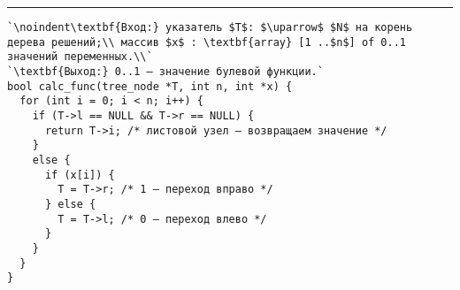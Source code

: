 \vspace{5pt} \hrule

\begin{lstlisting}[caption={Вычисление значения функции по сокращённому дереву решений}, label=p138_calc_function, escapechar=`]
`\noindent\textbf{Вход:} указатель $T$: $\uparrow$ $N$ на корень дерева решений;\\ массив $x$ : \textbf{array} [1 ..$n$] of 0..1 значений переменных.\\`
`\textbf{Выход:} 0..1 — значение булевой функции.`
bool calc_func(tree_node *T, int n, int *x) {
  for (int i = 0; i < n; i++) {
    if (T->l == NULL && T->r == NULL) {
      return T->i; /* листовой узел — возвращаем значениe */
    }
    else {
      if (x[i]) {
        T = T->r; /* 1 — переход вправо */
      } else {
        T = T->l; /* 0 — переход влево */
      }
    }
  }
}
\end{lstlisting}
